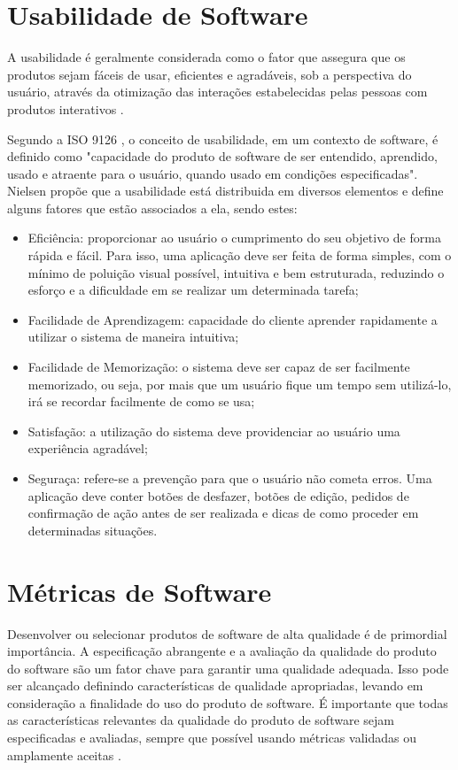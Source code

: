 \section{Usabilidade de Software}
A usabilidade é geralmente considerada como o fator que assegura que
os produtos sejam fáceis de usar, eficientes e agradáveis, sob a
perspectiva do usuário, através da otimização das interações
estabelecidas pelas pessoas com produtos interativos \cite{rogers_2013}.

Segundo a ISO 9126 \cite{iso9126}, o conceito de usabilidade, em um contexto de software, é definido como "capacidade do produto de software de ser entendido, aprendido, usado e atraente para o usuário, quando usado em condições especificadas". Nielsen \cite{nielsen_1994} propõe que a usabilidade está distribuida em diversos elementos e define alguns fatores que estão associados a ela, sendo estes:

\begin{itemize}
    \item Eficiência: proporcionar ao usuário o cumprimento do seu objetivo de forma rápida e fácil. Para isso, uma aplicação deve ser feita de forma simples, com o mínimo de poluição visual possível, intuitiva e bem estruturada, reduzindo o esforço e a dificuldade em se realizar um determinada tarefa;
    \item Facilidade de Aprendizagem: capacidade do cliente aprender rapidamente a utilizar o sistema de maneira intuitiva;
    \item Facilidade de Memorização: o sistema deve ser capaz de ser facilmente memorizado, ou seja, por mais que um usuário fique um tempo sem utilizá-lo, irá se recordar facilmente de como se usa;
    \item Satisfação: a utilização do sistema deve providenciar ao usuário uma experiência agradável;
    \item Seguraça: refere-se a prevenção para que o usuário não cometa erros. Uma aplicação deve conter botões de desfazer, botões de edição, pedidos de confirmação de ação antes de ser realizada e dicas de como proceder em determinadas situações.
\end{itemize}

\section{Métricas de Software}
Desenvolver ou selecionar produtos de software de alta qualidade é de primordial importância. A especificação abrangente e a avaliação da qualidade do produto do software são um fator chave para garantir uma qualidade adequada. Isso pode ser alcançado definindo características de qualidade apropriadas, levando em consideração a finalidade do uso do produto de software. É importante que todas as características relevantes da qualidade do produto de software sejam especificadas e avaliadas, sempre que possível usando métricas validadas ou amplamente aceitas \cite{iso9126}.

